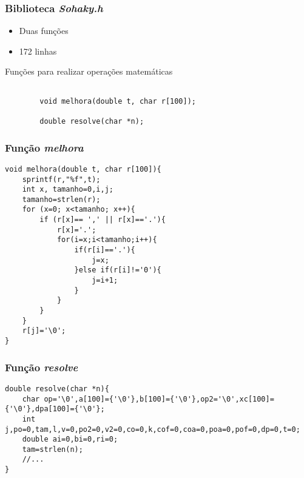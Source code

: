 \begin{frame}[fragile]
	\frametitle{Biblioteca \textit{Sohaky.h}}

	\begin{itemize}
		\item Duas funções
		\item 172 linhas
	\end{itemize}

	\begin{listing}[H]
		\caption{Funções para realizar operações matemáticas}
		\begin{verbatim}

		void melhora(double t, char r[100]);

		double resolve(char *n);
		\end{verbatim}
	\end{listing}
\end{frame}

\begin{frame}[fragile]
	\frametitle{Função \textit{melhora}}

	\begin{verbatim}
void melhora(double t, char r[100]){
	sprintf(r,"%f",t);
	int x, tamanho=0,i,j;
  	tamanho=strlen(r);
  	for (x=0; x<tamanho; x++){
		if (r[x]== ',' || r[x]=='.'){
			r[x]='.';
			for(i=x;i<tamanho;i++){
				if(r[i]=='.'){
					j=x;
				}else if(r[i]!='0'){
					j=i+1;
				}
	 		}
	  	}
  	}
  	r[j]='\0';
}
	\end{verbatim}
\end{frame}

\begin{frame}[fragile]
	\frametitle{Função \textit{resolve}}

	\begin{verbatim}
double resolve(char *n){
	char op='\0',a[100]={'\0'},b[100]={'\0'},op2='\0',xc[100]={'\0'},dpa[100]={'\0'};
	int j,po=0,tam,l,v=0,po2=0,v2=0,co=0,k,cof=0,coa=0,poa=0,pof=0,dp=0,t=0;
	double ai=0,bi=0,ri=0;
	tam=strlen(n);
	//...
}
	\end{verbatim}
\end{frame}
